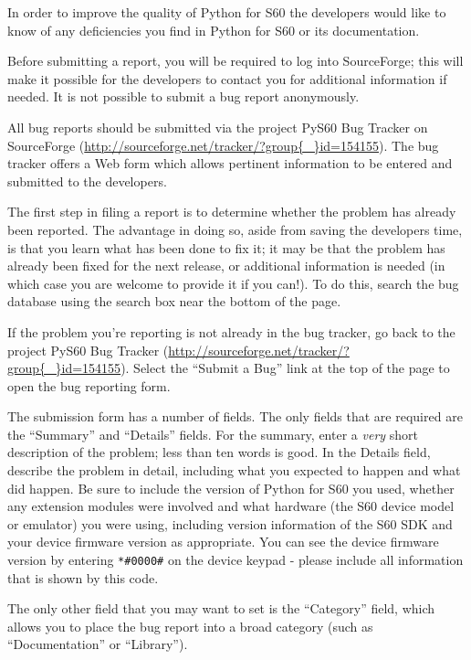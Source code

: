 
\label{reporting-bugs}

In order to improve the quality of Python for S60 the developers would like to 
know of any deficiencies you find in Python for S60 or its documentation.

Before submitting a report, you will be required to log into SourceForge;
this will make it possible for the developers to contact you
for additional information if needed.  It is not possible to submit a
bug report anonymously.

All bug reports should be submitted via the project PyS60 Bug Tracker on 
SourceForge (\url{http://sourceforge.net/tracker/?group{\_}id=154155}). The bug 
tracker offers a Web form which allows pertinent information to be entered and 
submitted to the developers.

The first step in filing a report is to determine whether the problem
has already been reported.  The advantage in doing so, aside from
saving the developers time, is that you learn what has been done to
fix it; it may be that the problem has already been fixed for the next
release, or additional information is needed (in which case you are
welcome to provide it if you can!).  To do this, search the bug
database using the search box near the bottom of the page.

If the problem you're reporting is not already in the bug tracker, go back to 
the project PyS60 Bug Tracker 
(\url{http://sourceforge.net/tracker/?group{\_}id=154155}).  Select the ``Submit a 
Bug'' link at the top of the page to open the bug reporting form.

The submission form has a number of fields.  The only fields that are required 
are the ``Summary'' and ``Details'' fields.  For the summary, enter a 
\emph{very} short description of the problem; less than ten words is good.  In 
the Details field, describe the problem in detail, including what you
expected to happen and what did happen.  Be sure to include the
version of Python for S60 you used, whether any extension modules were
involved and what hardware (the S60 device model or emulator) you were
using, including version information of the S60 SDK and your device
firmware version as appropriate. You can see the device firmware
version by entering \verb|*#0000#| on the device keypad - please
include all information that is shown by this code.

The only other field that you may want to set is the ``Category''
field, which allows you to place the bug report into a broad category
(such as ``Documentation'' or ``Library'').

